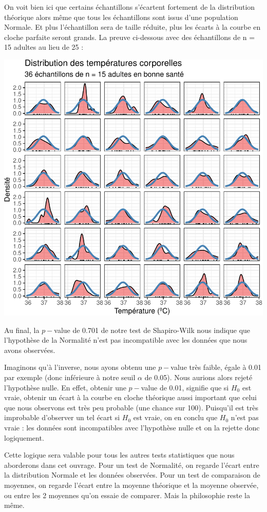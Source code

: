 \documentclass[
  a4paper,
  DIV=11,
  numbers=noendperiod,
  oneside]{scrreprt}
\begin{document}
On voit bien ici que certains échantillons s'écartent fortement de la
distribution théorique alors même que tous les échantillons sont issus
d'une population Normale. Et plus l'échantillon sera de taille réduite,
plus les écarts à la courbe en cloche parfaite seront grands. La preuve
ci-dessous avec des échantillons de n = 15 adultes au lieu de 25 :

\includegraphics{01-OneSampleTests_files/figure-pdf/unnamed-chunk-20-1.pdf}

Au final, la \(p-\)value de 0.701 de notre test de Shapiro-Wilk nous
indique que l'hypothèse de la Normalité n'est pas incompatible avec les
données que nous avons observées.

Imaginons qu'à l'inverse, nous ayons obtenu une \(p-\)value très faible,
égale à 0.01 par exemple (donc inférieure à notre seuil \(\alpha\) de
0.05). Nous aurions alors rejeté l'hypothèse nulle. En effet, obtenir
une \(p-\)value de 0.01, signifie que si \(H_0\) est vraie, obtenir un
écart à la courbe en cloche théorique aussi important que celui que nous
observons est très peu probable (une chance sur 100). Puisqu'il est très
improbable d'observer un tel écart si \(H_0\) est vraie, on en conclu
que \(H_0\) n'est pas vraie : les données sont incompatibles avec
l'hypothèse nulle et on la rejette donc logiquement.

Cette logique sera valable pour tous les autres tests statistiques que
nous aborderons dans cet ouvrage. Pour un test de Normalité, on regarde
l'écart entre la distribution Normale et les données observées. Pour un
test de comparaison de moyennes, on regarde l'écart entre la moyenne
théorique et la moyenne observée, ou entre les 2 moyennes qu'on essaie
de comparer. Mais la philosophie reste la même.
\end{document}
